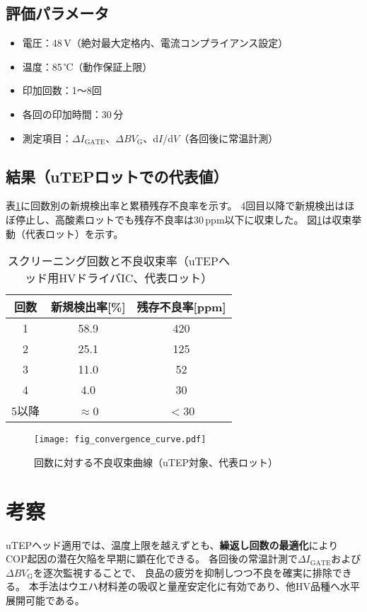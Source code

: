 \documentclass[twocolumn]{ieeetran}
\newcommand{\safeincludegraphics}[2][]{%
  \IfFileExists{#2}{\texttt{[image: \#2]}}{%
    \fbox{\parbox[c][0.45\linewidth][c]{0.9\linewidth}{\centering
    \textit{[Missing image: #2]}}}}}
\let\includegraphics\safeincludegraphics
\begin{document}
\subsection{評価パラメータ}
\begin{itemize}
\item 電圧：48\,V（絶対最大定格内、電流コンプライアンス設定）
\item 温度：85\,℃（動作保証上限）
\item 印加回数：1～8回
\item 各回の印加時間：30\,分
\item 測定項目：$\Delta I_\mathrm{GATE}$、$\Delta BV_\mathrm{G}$、d$I$/d$V$（各回後に常温計測）
\end{itemize}

\subsection{結果（uTEPロットでの代表値）}
表\ref{tab_results}に回数別の新規検出率と累積残存不良率を示す。
4回目以降で新規検出はほぼ停止し、高酸素ロットでも残存不良率は30\,ppm以下に収束した。
図\ref{fig_convergence}は収束挙動（代表ロット）を示す。

\begin{table}[t]
\centering
\caption{スクリーニング回数と不良収束率（uTEPヘッド用HVドライバIC、代表ロット）}
\label{tab_results}
\begin{tabular}{ccc}
\toprule
回数 & 新規検出率[\%] & 残存不良率[ppm] \\
\midrule
1 & 58.9 & 420 \\
2 & 25.1 & 125 \\
3 & 11.0 & 52 \\
4 & 4.0  & 30 \\
5以降 & $\approx$0 & $<$30 \\
\bottomrule
\end{tabular}
\end{table}

\begin{figure}[t]
  \centering
  \texttt{[image: fig\_convergence\_curve.pdf]}
  \caption{回数に対する不良収束曲線（uTEP対象、代表ロット）}
  \label{fig_convergence}
\end{figure}

\section{考察}
uTEPヘッド適用では、温度上限を越えずとも、\textbf{繰返し回数の最適化}により
COP起因の潜在欠陥を早期に顕在化できる。
各回後の常温計測で$\Delta I_\mathrm{GATE}$および$\Delta BV_\mathrm{G}$を逐次監視することで、
良品の疲労を抑制しつつ不良を確実に排除できる。
本手法はウエハ材料差の吸収と量産安定化に有効であり、他HV品種へ水平展開可能である。
\end{document}
